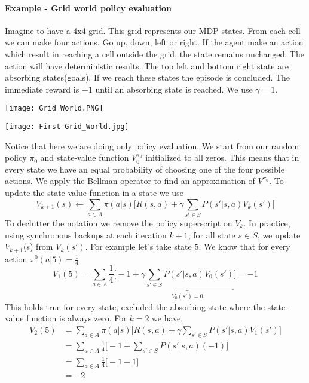 \documentclass[main.tex]{subfiles}
\begin{document}
\paragraph{Example - Grid world policy evaluation} Imagine to have a 4x4 grid. This grid represents our MDP states. From each cell we can make four actions. Go up, down, left or right. If the agent make an action which result in reaching a cell outside the grid, the state remains unchanged. The action will have deterministic results. The top left and bottom right state are absorbing states(goals). If we reach these states the episode is concluded. The immediate reward is $-1$ until an absorbing state is reached. We use $\gamma = 1$.
\begin{center}
    \texttt{[image: Grid\_World.PNG]}
\end{center}
\begin{center}
    \texttt{[image: First-Grid\_World.jpg]}
\end{center}
Notice that here we are doing only policy evaluation.
We start from our random policy $\pi_0$ and state-value function $V^{\pi_0}_0$ initialized to all zeros. This means that in every state we have an equal probability of choosing one of the four possible actions. We apply the Bellman operator to find an approximation of $V^{\pi_0}$. To update the state-value function in a state we use
\begin{equation*}
    V_{k+1}(s) \leftarrow \sum_{a \in A} \pi(a|s) \bigg[ R(s,a) + \gamma \sum_{s' \in S} P(s'|s,a)V_k(s') \bigg]
\end{equation*}
To declutter the notation we remove the policy superscript on $V_k$.
In practice, using synchronous backups at each iteration $k+1$, for all state $s \in S$, we update $V_{k+1}$(s) from $V_k(s')$.
For example let's take state $5$. We know that for every action $\pi^0(a|5) = \frac{1}{4}$
\begin{equation*}
V_1(5) = \sum_{a \in A} \frac{1}{4} \bigg[ -1 + \underbrace{\gamma \sum_{s' \in S} P(s'|s,a)V_0(s')}_{V_0(s')=0} \bigg] = -1
\end{equation*}
This holds true for every state, excluded the absorbing state where the state-value function is always zero.
For $k=2$ we have. 
\begin{align*}
    V_2(5) &= \sum_{a \in A} \pi(a|s) \bigg[ R(s,a) + \gamma \sum_{s' \in S} P(s'|s,a)V_1(s') \bigg] \\
    &= \sum_{a \in A} \frac{1}{4} \bigg[ -1 + \sum_{s' \in S} P(s'|s,a) (-1) \bigg] \\
    &= \sum_{a \in A} \frac{1}{4} \bigg[ -1 -1 \bigg] \\
    &= -2
\end{align*}
\end{document}
